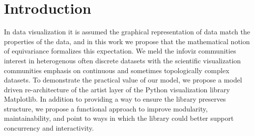 \documentclass[../main.tex]{subfiles}
\begin{document}
\section{Introduction}
\label{sec:introduction}
In data visualization it is assumed the graphical representation of data match the properties of the data, and in this work we propose that the mathematical notion of equivariance formalizes this expectation. We meld the infoviz communities interest in heterogenous often discrete datasets with the scientific visualization communities emphasis on continuous and sometimes topologically complex datasets. To demonstrate the practical value of our model, we propose a model driven re-architecture of the artist layer of the Python visualization library Matplotlib. In addition to providing a way to ensure the library preserves structure, we propose a functional approach to  improve modularity, maintainability, and point to ways in which the library could better support concurrency and interactivity.
\end{document}
